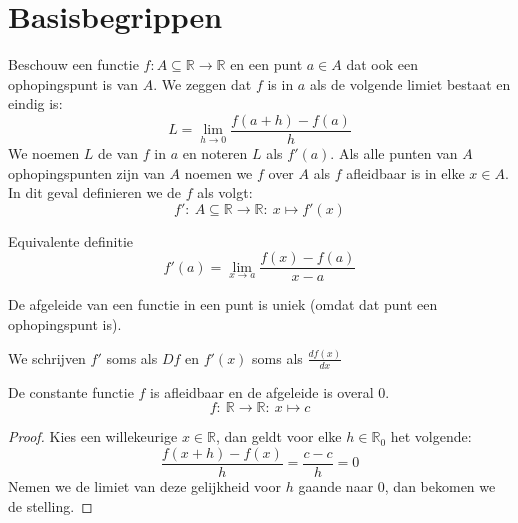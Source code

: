 \documentclass[main.tex]{subfiles}
\begin{document}
\section{Basisbegrippen}
\label{sec:basisbegrippen}

\begin{de}
  Beschouw een functie $f: A \subseteq \mathbb{R} \rightarrow \mathbb{R}$ en een punt $a\in A$ dat ook een ophopingspunt is van $A$.
  We zeggen dat $f$  is in $a$ als de volgende limiet bestaat en eindig is:
  \[ L = \lim_{h\rightarrow 0}\frac{f(a+h)-f(a)}{h} \]
  We noemen $L$ de  van $f$ in $a$ en noteren $L$ als $f'(a)$.
  Als alle punten van $A$ ophopingspunten zijn van $A$ noemen we $f$  over $A$ als $f$ afleidbaar is in elke $x\in A$.
  In dit geval definieren we de  $f$ als volgt:
  \[ f':\ A \subseteq \mathbb{R} \rightarrow \mathbb{R}:\ x \mapsto f'(x) \]
\end{de}

\begin{st}
  Equivalente definitie
  \[ f'(a) = \lim_{x \rightarrow a}\frac{f(x)-f(a)}{x-a} \]
\end{st}

\begin{st}
  De afgeleide van een functie in een punt is uniek (omdat dat punt een ophopingspunt is).
\end{st}
\begin{de}
  We schrijven $f'$ soms als $Df$ en $f'(x)$ soms als $\frac{df(x)}{dx}$
\end{de}

\begin{vb}
  De constante functie $f$ is afleidbaar en de afgeleide is overal $0$.
  \[ f:\ \mathbb{R} \rightarrow \mathbb{R}:\ x \mapsto c \]

  \begin{proof}
    Kies een willekeurige $x \in \mathbb{R}$, dan geldt voor elke $h\in \mathbb{R}_{0}$ het volgende:
    \[ \frac{f(x+h)-f(x)}{h} = \frac{c-c}{h} = 0 \]
    Nemen we de limiet van deze gelijkheid voor $h$ gaande naar $0$, dan bekomen we de stelling.
  \end{proof}
\end{vb}
\end{document}
